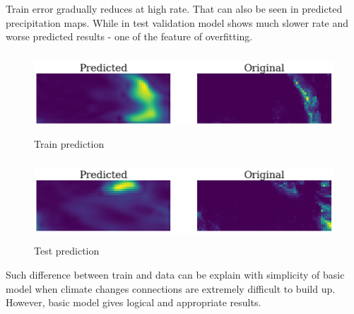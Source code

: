 \documentclass{article}
\begin{document}
Train error gradually reduces at high rate. That can also be seen in predicted precipitation maps. While in test validation model shows much slower rate and worse predicted results - one of the feature of overfitting. 

\begin{figure}[h] 
\centering
\includegraphics[height=3cm]{example.png}
\caption{ Train prediction\label{overflow}}
\end{figure}

\begin{figure}[h] 
\centering
\includegraphics[height=3cm]{test pred.png}
\caption{ Test prediction\label{overflow}}
\end{figure}


Such difference between train and data can be explain with simplicity of basic model when climate changes connections are extremely difficult to build up. However, basic model gives logical and appropriate results. 



\pagebreak


\end{document}
